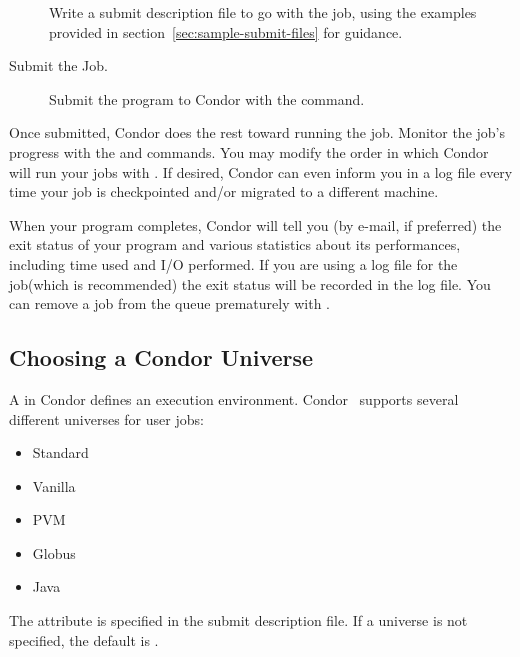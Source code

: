 \begin{description}
Write a submit description file to go with the job, using
the examples provided in section~\ref{sec:sample-submit-files}
for guidance.

\item[Submit the Job.]Submit the program to Condor with
the  command.

\end{description}

Once submitted, Condor does the rest toward running
the job.
Monitor the job's progress with the 
and  commands.
You may modify the order in which Condor will run your jobs with
. If desired, Condor can even inform you in a log file 
every time your job is checkpointed and/or migrated to a different machine. 

When your program completes, Condor will tell you
(by e-mail, if preferred) the exit status of your program and various
statistics about its performances, including time used and I/O performed.
If you are using a log file for the job(which is recommended) the exit
status will be recorded in the log file.
You can remove a job from the
queue prematurely with . 


\subsection{\label{sec:Choosing-Universe}
Choosing a Condor Universe}

A  in Condor
defines an execution environment. 
Condor \VersionNotice\ supports several different
universes for user jobs:
\begin{itemize}
	\item Standard
	\item Vanilla
	\item PVM
	\item Globus
	\item Java
\end{itemize}

The  attribute is specified in the submit description file.
If a universe is not specified, the default is .

